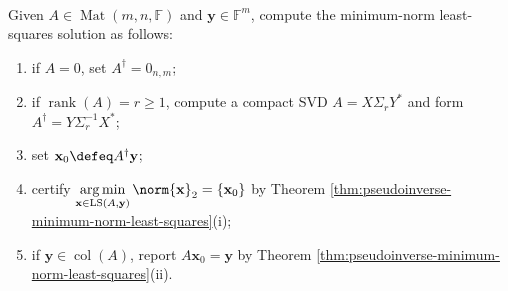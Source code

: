 \begin{computationmethod} \label{meth:pseudoinverse-solution-method} \\
Given $A\in\operatorname{Mat}(m,n,\mathbb{F})$ and $\mathbf{y}\in\mathbb{F}^m$, compute the minimum-norm least-squares solution as follows:
\begin{enumerate}[label=(\roman*)]
\setlength{\itemsep}{0pt}
\item if $A=0$, set $A^{\dagger}=0_{n,m}$;
\item if $\operatorname{rank}(A)=r\geq1$, compute a compact SVD $A=X\Sigma_rY^*$ and form $A^{\dagger}=Y\Sigma_r^{-1}X^*$;
\item set $\mathbf{x}_0\defeq A^{\dagger}\mathbf{y}$;
\item certify $\operatorname*{arg\,min}\limits_{\mathbf{x}\in\operatorname{LS}(A,\mathbf{y})}\norm{\mathbf{x}}_2=\{\mathbf{x}_0\}$ by Theorem \ref{thm:pseudoinverse-minimum-norm-least-squares}(i);
\item if $\mathbf{y}\in\operatorname{col}(A)$, report $A\mathbf{x}_0=\mathbf{y}$ by Theorem \ref{thm:pseudoinverse-minimum-norm-least-squares}(ii).
\end{enumerate}
\end{computationmethod}
